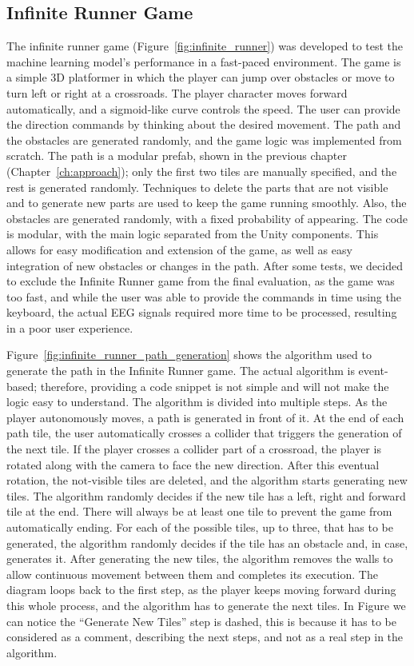 \subsection*{Infinite Runner Game}
The infinite runner game (Figure~\ref{fig:infinite_runner}) was developed to test the machine learning model's performance in a fast-paced environment.
The game is a simple 3D platformer in which the player can jump over obstacles or move to turn left or right at a crossroads.
The player character moves forward automatically, and a sigmoid-like curve controls the speed.
The user can provide the direction commands by thinking about the desired movement.
The path and the obstacles are generated randomly, and the game logic was implemented from scratch.
The path is a modular prefab, shown in the previous chapter (Chapter~\ref{ch:approach}); only the first two tiles are manually specified, and the rest is generated randomly.
Techniques to delete the parts that are not visible and to generate new parts are used to keep the game running smoothly.
Also, the obstacles are generated randomly, with a fixed probability of appearing.
The code is modular, with the main logic separated from the Unity components.
This allows for easy modification and extension of the game, as well as easy integration of new obstacles or changes in the path.
After some tests, we decided to exclude the Infinite Runner game from the final evaluation, as the game was too fast, and while the user was able to provide the commands in time using the keyboard, the actual EEG signals required more time to be processed, resulting in a poor user experience. 

Figure~\ref{fig:infinite_runner_path_generation} shows the algorithm used to generate the path in the Infinite Runner game.
The actual algorithm is event-based; therefore, providing a code snippet is not simple and will not make the logic easy to understand.
The algorithm is divided into multiple steps. As the player autonomously moves, a path is generated in front of it.
At the end of each path tile, the user automatically crosses a collider that triggers the generation of the next tile.
If the player crosses a collider part of a crossroad, the player is rotated along with the camera to face the new direction.
After this eventual rotation, the not-visible tiles are deleted, and the algorithm starts generating new tiles.
The algorithm randomly decides if the new tile has a left, right and forward tile at the end.
There will always be at least one tile to prevent the game from automatically ending.
For each of the possible tiles, up to three, that has to be generated, the algorithm randomly decides if the tile has an obstacle and, in case, generates it.
After generating the new tiles, the algorithm removes the walls to allow continuous movement between them and completes its execution.
The diagram loops back to the first step, as the player keeps moving forward during this whole process, and the algorithm has to generate the next tiles.
In Figure we can notice the ``Generate New Tiles'' step is dashed, this is because it has to be considered as a comment, describing the next steps, and not as a real step in the algorithm.

